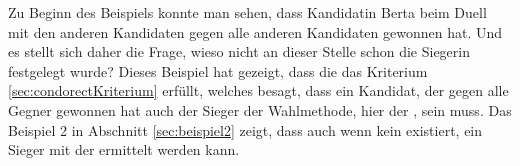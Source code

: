 Zu Beginn des Beispiels konnte man sehen, dass Kandidatin Berta beim Duell mit den anderen Kandidaten gegen alle anderen Kandidaten gewonnen hat. Und es stellt sich daher die Frage, wieso nicht an dieser Stelle schon die Siegerin festgelegt wurde? Dieses Beispiel hat gezeigt, dass die \schulze das \condorcet Kriterium \ref{sec:condorectKriterium} erfüllt, welches besagt, dass ein Kandidat, der gegen alle Gegner gewonnen hat auch der Sieger der Wahlmethode, hier der \schulze, sein muss. Das Beispiel 2 in Abschnitt \ref{sec:beispiel2} zeigt, dass auch wenn kein \condorcetSieger existiert, ein Sieger mit der \schulze ermittelt werden kann.



